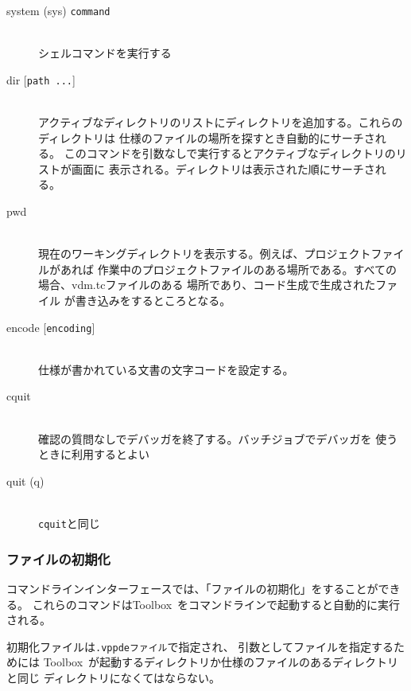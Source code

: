 \documentclass[\pformat,12pt]{jarticle}
\newcommand{\Toolbox}{Toolbox}
\newcommand{\vdmde}{vppde}
\begin{document}
\begin{description}
\item[system (sys) {\tt command}]\mbox{}\\
  シェルコマンドを実行する

\item[dir \mbox{[{\tt path ...}]}] \mbox{}\\
  アクティブなディレクトリのリストにディレクトリを追加する。これらのディレクトリは
  仕様のファイルの場所を探すとき自動的にサーチされる。
  このコマンドを引数なしで実行するとアクティブなディレクトリのリストが画面に
  表示される。ディレクトリは表示された順にサーチされる。

\item[pwd]  \mbox{}\\
  現在のワーキングディレクトリを表示する。例えば、プロジェクトファイルがあれば
  作業中のプロジェクトファイルのある場所である。すべての場合、vdm.tcファイルのある
  場所であり、コード生成で生成されたファイル 
  が書き込みをするところとなる。

\item[encode \mbox{[{\tt encoding}]}] \mbox{}\\
  仕様が書かれている文書の文字コードを設定する。

\item[cquit]  \mbox{}\\
  確認の質問なしでデバッガを終了する。バッチジョブでデバッガを
  使うときに利用するとよい

\item[quit (q)] \mbox{}\\
  {\tt cquit}と同じ

\end{description}

\subsubsection{ファイルの初期化}


コマンドラインインターフェースでは、「ファイルの初期化」をすることができる。
これらのコマンドは\Toolbox\ をコマンドラインで起動すると自動的に実行される。

初期化ファイルは{\tt .\vdmde ファイル}\index{.\vdmde ファイル}で指定され、
引数としてファイルを指定するためには
\Toolbox\ が起動するディレクトリか仕様のファイルのあるディレクトリと同じ
ディレクトリになくてはならない。
\end{document}
